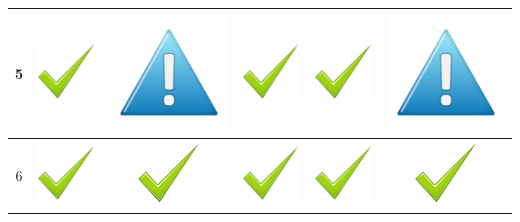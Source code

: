 \documentclass[12pt]{article}
\begin{document}
\begin{center}
\begin{tabular}{*{6}{|c}|}
    5 & \includegraphics[scale=0.2]{Billeder/godt}& \includegraphics[scale=0.1]{Billeder/mindre} &  \includegraphics[scale=0.2]{Billeder/godt}& \includegraphics[scale=0.2]{Billeder/godt}&  \includegraphics[scale=0.1]{Billeder/mindre}\\
     & \includegraphics[scale=0.2]{Billeder/godt}&  \includegraphics[scale=0.2]{Billeder/godt}&  \includegraphics[scale=0.2]{Billeder/godt}& \includegraphics[scale=0.2]{Billeder/godt}& \includegraphics[scale=0.2]{Billeder/godt}\\

\end{tabular}
\end{center}
\end{document}
